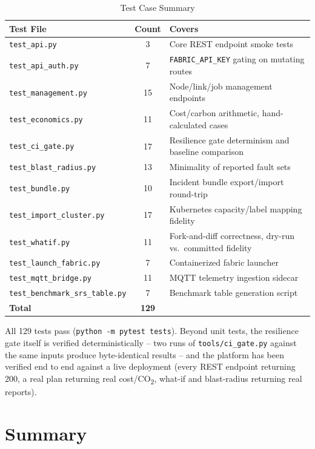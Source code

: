 \documentclass[12pt,a4]{report}
\begin{document}
\begin{table}[H]
\centering
\caption{Test Case Summary}
\label{tab:test-case-summary}
\begin{tabular}{|l|c|p{6.3cm}|}
\hline
\textbf{Test File} & \textbf{Count} & \textbf{Covers} \\
\hline
\texttt{test\_api.py} & 3 & Core REST endpoint smoke tests \\
\texttt{test\_api\_auth.py} & 7 & \texttt{FABRIC\_API\_KEY} gating on mutating routes \\
\texttt{test\_management.py} & 15 & Node/link/job management endpoints \\
\texttt{test\_economics.py} & 11 & Cost/carbon arithmetic, hand-calculated cases \\
\texttt{test\_ci\_gate.py} & 17 & Resilience gate determinism and baseline comparison \\
\texttt{test\_blast\_radius.py} & 13 & Minimality of reported fault sets \\
\texttt{test\_bundle.py} & 10 & Incident bundle export/import round-trip \\
\texttt{test\_import\_cluster.py} & 17 & Kubernetes capacity/label mapping fidelity \\
\texttt{test\_whatif.py} & 11 & Fork-and-diff correctness, dry-run vs.\ committed fidelity \\
\texttt{test\_launch\_fabric.py} & 7 & Containerized fabric launcher \\
\texttt{test\_mqtt\_bridge.py} & 11 & MQTT telemetry ingestion sidecar \\
\texttt{test\_benchmark\_srs\_table.py} & 7 & Benchmark table generation script \\
\hline
\textbf{Total} & \textbf{129} & \\
\hline
\end{tabular}
\end{table}

All 129 tests pass (\texttt{python -m pytest tests}). Beyond unit tests, the resilience gate itself is verified deterministically -- two runs of \texttt{tools/ci\_gate.py} against the same inputs produce byte-identical results -- and the platform has been verified end to end against a live deployment (every REST endpoint returning 200, a real plan returning real cost/CO\textsubscript{2}, what-if and blast-radius returning real reports).

 \section{Summary}
\end{document}
